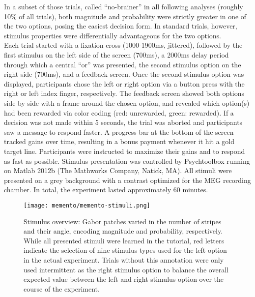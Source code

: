 In a subset of those trials, called ``no-brainer'' in all following analyses (roughly 10\% of all trials), both magnitude and probability were strictly greater in one of the two options, posing the easiest decision form.
In standard trials, however, stimulus properties were differentially advantageous for the two options.\\
Each trial started with a fixation cross (1000-1900ms, jittered), followed by the first stimulus on the left side of the screen (700ms), a 2000ms delay period through which a central ``or'' was presented, the second stimulus option on the right side (700ms), and a feedback screen.
Once the second stimulus option was displayed, participants chose the left or right option via a button press with the right or left index finger, respectively.
The feedback screen showed both options side by side with a frame around the chosen option, and revealed which option(s) had been rewarded via color coding (red: unrewarded, green: rewarded).
If a decision was not made within 5 seconds, the trial was aborted and participants saw a message to respond faster.
A progress bar at the bottom of the screen tracked gains over time, resulting in a bonus payment whenever it hit a gold target line.
Participants were instructed to maximize their gains and to respond as fast as possible.
Stimulus presentation was controlled by Psychtoolbox \citep{kleiner2007s} running on Matlab 2012b (The Mathworks Company, Natick, MA).
All stimuli were presented on a grey background with a contrast optimized for the MEG recording chamber.
In total, the experiment lasted approximately 60 minutes.

\begin{figure}
	\centering
	\texttt{[image: memento/memento-stimuli.png]}
	\caption[Stimulus overview]{Stimulus overview: Gabor patches varied in the number of stripes and their angle, encoding magnitude and probability, respectively. While all presented stimuli were learned in the tutorial, red letters indicate the selection of nine stimulus types used for the left option in the actual experiment. Trials without this annotation were only used intermittent as the right stimulus option to balance the overall expected value between the left and right stimulus option over the course of the experiment.}
	\label{fig:memento_stim}
\end{figure}


